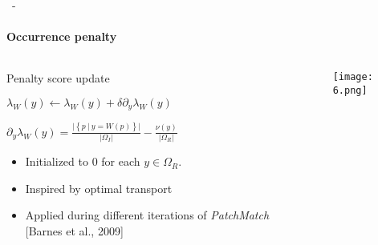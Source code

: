 \documentclass[aspectratio=169, 22pt]{beamer}
\begin{document}
\begin{frame}{\secname~- \subsecname}
  \framesubtitle{Occurrence penalty}
  \begin{columns}
    \begin{column}{0.5\linewidth}      
      \begin{block}{Penalty score update}
        \small
        \begin{center}
          $\lambda_W(y) \leftarrow \lambda_W(y) + \delta \partial_y \lambda_W(y) $
          
          $\partial_y\lambda_W(y) = \frac{\lvert\left\{p\ |\ y =
              W(p)\right\}\rvert}{\lvert\Omega_I\rvert} -
          \frac{\nu(y)}{\lvert\Omega_R\rvert}$
        \end{center}
        
        \begin{itemize}
        \item Initialized to 0 for each $y \in \Omega_R$.
        \item Inspired by optimal transport
        \item Applied during different iterations of \emph{PatchMatch} [Barnes et al., 2009]
        \end{itemize}
      \end{block}    
    \end{column}
    
    \begin{column}{0.5\linewidth}
      \begin{figure}
        \centering
        \texttt{[image: 6.png]}
      \end{figure}
    \end{column}
  \end{columns}
\end{frame}
\end{document}
